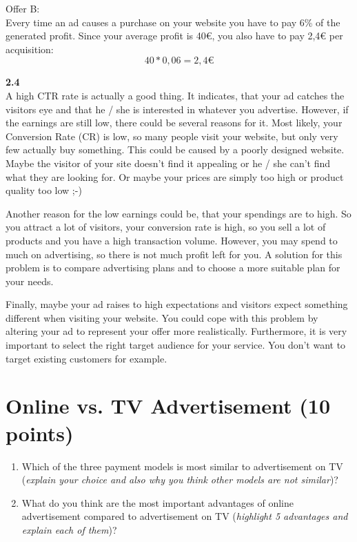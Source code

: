 \documentclass{WeSTassignment}
\begin{document}
Offer B:\\
Every time an ad causes a purchase on your website you have to pay 6\% of the generated profit. Since your average profit is 40€, you also have to pay 2,4€ per acquisition: 
$$40 * 0,06 = 2,4€$$

\textbf{2.4}\\
A high CTR rate is actually a good thing. It indicates, that your ad catches the visitors eye and that he / she is interested in whatever you advertise. However, if the earnings are still low, there could be several reasons for it. Most likely, your Conversion Rate (CR) is low, so many people visit your website, but only very few actually buy something. This could be caused by a poorly designed website. Maybe the visitor of your site doesn't find it appealing or he / she can't find what they are looking for. Or maybe your prices are simply too high or product quality too low ;-) 

Another reason for the low earnings could be, that your spendings are to high. So you attract a lot of visitors, your conversion rate is high, so you sell a lot of products and you have a high transaction volume. However, you may spend to much on advertising, so there is not much profit left for you. A solution for this problem is to compare advertising plans and to choose a more suitable plan for your needs. 

Finally, maybe your ad raises to high expectations and visitors expect something different when visiting your website. You could cope with this problem by altering your ad to represent your offer more realistically. Furthermore, it is very important to select the right target audience for your service. You don't want to target existing customers for example. 


\section{Online vs. TV Advertisement (10 points)}

\begin{enumerate}
\item Which of the three payment models is most similar to advertisement on TV (\textit{explain your choice and also why you think other models are not similar})? 
\item What do you think are the most important advantages of online advertisement
compared   to   advertisement  on  TV  (\textit{highlight 5 advantages and explain each of them})? 
\end{enumerate} 
\end{document}
